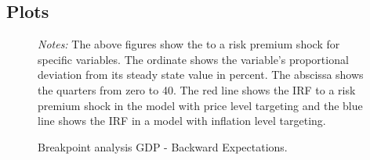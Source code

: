 \documentclass[11pt, a4paper, leqno]{article}
\begin{document}
\subsection{Plots}

\begin{figure}[ht!]
	\caption{Breakpoint analysis GDP - Backward Expectations.}
	\centering
    	\bigskip
	\begin{minipage}{\textwidth}%
		\footnotesize\setlength{\baselineskip}{11pt}%
		\bigskip \textit{Notes:} The above figures show the  to a risk premium shock for specific variables. The ordinate shows the variable's proportional deviation from its steady state value in percent. The abscissa shows the quarters from zero to 40. The red line shows the IRF to a risk premium shock in the model with price level targeting and the blue line shows the IRF in a model with inflation level targeting.
	\end{minipage}
\end{figure}
\end{document}
